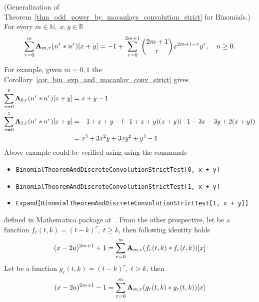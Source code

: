 \begin{cor}
    \label{cor_bin_exp_and_macaulay_conv_strict}
    (Generalization of Theorem~\ref{thm_odd_power_by_macaulays_convolution_strict} for Binomials.)
    For every $m\in\mathbb{N}, \; x,y\in\mathbb{R}$
    \begin{equation*}
        \sum_{r=0}^{m} {\mathbf{A}} \sb{m,r} (n \sp{r} \ast n \sp{r}) [x+y]
        =
        -1 + \sum_{r=0}^{2m+1} \binom{2m+1}{r} x^{2m+1-r} y^r, \quad n\geq 0.
    \end{equation*}
\end{cor}
For example, given $m=0,1$ the Corollary~\ref{cor_bin_exp_and_macaulay_conv_strict} gives
\begin{equation*}
    \begin{split}
        \sum_{r=0}^{0} {\mathbf{A}} \sb{0,r} (n \sp{r} \ast n \sp{r}) [x+y]
        &= x + y - 1 \\
        \sum_{r=0}^{1} {\mathbf{A}} \sb{1,r} (n \sp{r} \ast n \sp{r}) [x+y]
        &= -1 + x + y - (-1 + x + y) (x + y) (-1 - 3 x - 3 y + 2 (x + y)) \\
        &= x^3 + 3 x^2 y + 3 x y^2 + y^3 - 1
    \end{split}
\end{equation*}
Above example could be verified using using the commands
\begin{itemize}
    \item \texttt{BinomialTheoremAndDiscreteConvolutionStrictTest[0, x + y]}
    \item \texttt{BinomialTheoremAndDiscreteConvolutionStrictTest[1, x + y]}
    \item \texttt{Expand[BinomialTheoremAndDiscreteConvolutionStrictTest[1, x + y]]}
\end{itemize}
defined in Mathematica package at~\cite{PK22Source}.
From the other prospective, let be a function $f_r(t,k) = (t-k)^r, \; t \geq k$, then following identity holds
\begin{equation}
(x-2a)
    ^{2m+1} + 1 =\sum_{r=0}^{m} {\mathbf{A}} \sb{m,r} (f_r(t,k) \ast f_r(t,k))[x]
    \label{eq:parametric-identity}
\end{equation}
Let be a function $g_r(t,k) = (t-k)^r, \; t > k$, then
\begin{equation}
(x-2a)
    ^{2m+1} - 1 =\sum_{r=0}^{m} {\mathbf{A}} \sb{m,r} (g_r(t,k) \ast g_r(t,k))[x]
    \label{eq:parametric-identity-strict}
\end{equation}

